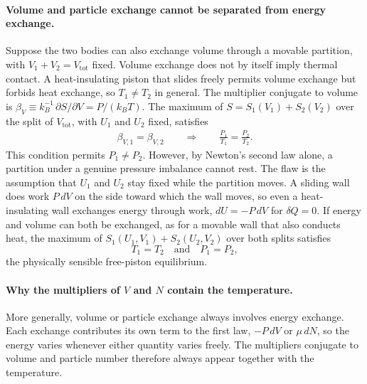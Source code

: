 \paragraph{Volume and particle exchange cannot be separated from energy exchange.}
Suppose the two bodies can also exchange volume through a movable partition,
with $V_1+V_2=V_{\text{tot}}$ fixed. Volume exchange does not by itself
imply thermal contact. A heat-insulating piston that slides freely permits
volume exchange but forbids heat exchange, so $T_1\neq T_2$ in general. The
multiplier conjugate to volume is
$\beta_V\equiv k_B^{-1}\,\partial S/\partial V=P/(k_BT)$. The maximum of
$S=S_1(V_1)+S_2(V_2)$ over the split of $V_{\text{tot}}$, with $U_1$ and
$U_2$ fixed, satisfies
\begin{align*}
    \beta_{V,1}=\beta_{V,2}
    \qquad\Longrightarrow\qquad
    \frac{P_1}{T_1}=\frac{P_2}{T_2}.
\end{align*}
This condition permits $P_1\neq P_2$. However, by Newton's second law alone,
a partition under a genuine pressure imbalance cannot rest. The flaw is the
assumption that $U_1$ and $U_2$ stay fixed while the partition moves. A
sliding wall does work $P\,dV$ on the side toward which the wall moves, so even a
heat-insulating wall exchanges energy through work, $dU=-P\,dV$ for
$\delta Q=0$. If energy and volume can both be exchanged, as for a movable
wall that also conducts heat, the maximum of $S_1(U_1,V_1)+S_2(U_2,V_2)$
over both splits satisfies
\begin{equation}
    \boxed{T_1=T_2 \quad\text{and}\quad P_1=P_2,}
\end{equation}
the physically sensible free-piston equilibrium.

\paragraph{Why the multipliers of $V$ and $N$ contain the temperature.}
More generally, volume or particle exchange always involves energy exchange.
Each exchange contributes its own term to the first law, $-P\,dV$ or
$\mu\,dN$, so the energy varies whenever either quantity varies freely. The
multipliers conjugate to volume and particle number therefore always appear
together with the temperature.
